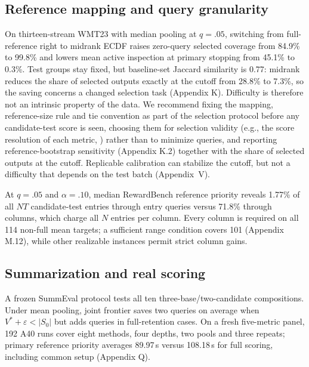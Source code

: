 \documentclass[11pt]{article}
\newcommand{\Sz}{S_0}
\begin{document}
\subsection{Reference mapping and query granularity}
On thirteen-stream WMT23 with median pooling at $q=.05$, switching from full-reference right to midrank ECDF raises zero-query selected coverage from 84.9\% to 99.8\% and lowers mean active inspection at primary stopping from 45.1\% to 0.3\%. Test groups stay fixed, but baseline-set Jaccard similarity is 0.77: midrank reduces the share of selected outputs exactly at the cutoff from 28.8\% to 7.3\%, so the saving concerns a changed selection task (Appendix K). Difficulty is therefore not an intrinsic property of the data. We recommend fixing the mapping, reference-size rule and tie convention as part of the selection protocol before any candidate-test score is seen, choosing them for selection validity (e.g., the score resolution of each metric, \citealt{deutsch2023ties}) rather than to minimize queries, and reporting reference-bootstrap sensitivity (Appendix K.2) together with the share of selected outputs at the cutoff. Replicable calibration can stabilize the cutoff, but not a difficulty that depends on the test batch (Appendix~V).

At $q=.05$ and $\alpha=.10$, median RewardBench reference priority reveals 1.77\% of all $NT$ candidate-test entries through entry queries versus 71.8\% through columns, which charge all $N$ entries per column. Every column is required on all 114 non-full mean targets; a sufficient range condition covers 101 (Appendix M.12), while other realizable instances permit strict column gains.

\subsection{Summarization and real scoring}
A frozen SummEval protocol \citep{fabbri2021summeval} tests all ten three-base/two-candidate compositions. Under mean pooling, joint frontier saves two queries on average when $V^*+\varepsilon<|\Sz|$ but adds queries in full-retention cases. On a fresh five-metric panel, 192 A40 runs cover eight methods, four depths, two pools and three repeats; primary reference priority averages 89.97\,s versus 108.18\,s for full scoring, including common setup (Appendix Q).
\end{document}
